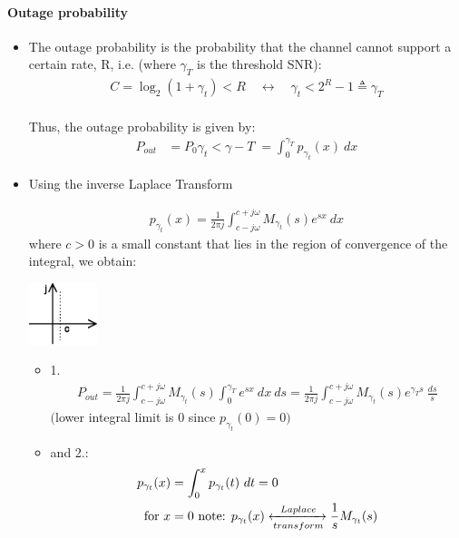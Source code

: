 \documentclass[a4paper, 10pt]{article}
\begin{document}
\paragraph{Outage probability}
\begin{itemize}
	\item The outage probability is the probability that the channel cannot support a certain rate, R, i.e. (where \begin{math} \gamma_T \end{math} is the threshold SNR):
		\begin{align*}
			C = \log_2(1+\gamma_t) < R \quad \leftrightarrow \quad \gamma_t < 2^R - 1 \triangleq \gamma_T
		\end{align*}\\
		Thus, the outage probability is given by:
		\begin{align*}
			P_{out} &= P_0 {\gamma_t <\gamma-T}  \;= \int_{0}^{\gamma_T}p_{\gamma_t}(x)~dx
		\end{align*}
\item Using the inverse Laplace Transform\\
\begin{minipage}[hbt]{7cm}
	\centering
		\begin{align*}
			p_{\gamma  _t}(x) = \frac{1}{2\pi j}\int_{c-j\omega}^{c+j\omega}M_{\gamma _t}(s)e^{sx}~dx
		\end{align*}
	where \begin{math} c > 0\end{math} is a small constant that lies in the region of convergence of the integral, we obtain:
\end{minipage}
\hfill
\begin{minipage}[hbt]{5cm}
	\centering
	\includegraphics[width=2cm]{SIMO_Konstante_c}
\end{minipage}

\begin{itemize}
	\item 1.
			\begin{align*}
				P_{out} = \frac{1}{2\pi j}\int_{c-j\omega}^{c+j\omega}M_{\gamma _t}(s)\int_{0}^{\gamma _T}e^{sx}~dx~ds = \frac{1}{2\pi j}\int_{c-j\omega}^{c+j\omega}M_{\gamma _t}(s)e^{\gamma _Ts}~\frac{ds}{s}
			\end{align*}
			\begin{math}\bigl (\end{math}lower integral limit is 0 since \begin{math}p_{\gamma _t}(0) = 0 \bigr )\end{math}
	\item and 2.:
		\begin{align*}
			p_{\gamma _t} (x) &= \int_{0}^{x} p_{\gamma _t}(t) ~dt = 0\\		
		\text{for } x &= 0 \text{ note: } p_{\gamma _t}(x) \xleftrightarrow [transform]{Laplace} \frac{1}{s}M_{\gamma _t}(s)
		\end{align*}
	\end{itemize}
\end{itemize}
\end{document}

